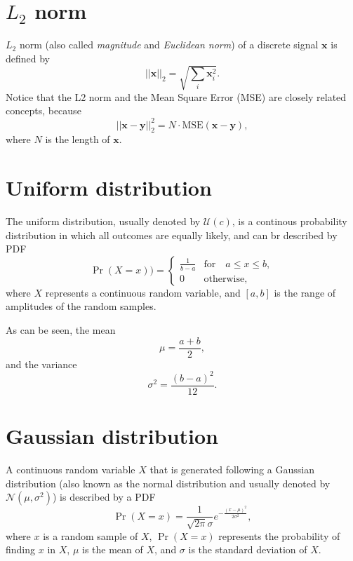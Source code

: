 
\section{$L_2$ norm}
\label{sec:L2_norm}

$L_2$ norm (also called \emph{magnitude} and \emph{Euclidean norm}) of
a discrete signal $\mathbf{x}$ is defined by
\begin{equation}
  ||\mathbf{x}||_2 = \sqrt{\sum_i\mathbf{x}_i^2}.
\end{equation}
Notice that the L2 norm and the Mean Square Error (MSE) are closely
related concepts, because
\begin{equation}
  ||\mathbf{x} - \mathbf{y}||_2^2 = N\cdot\text{MSE}(\mathbf{x} - \mathbf{y}),
\end{equation}
where $N$ is the length of $\mathbf{x}$.


\section{Uniform distribution}

The uniform distribution, usually denoted by $\mathcal{U}(c)$, is a
continous probability distribution in which all outcomes are equally
likely, and can br described by \gls{PDF}
\begin{equation}
  \Pr(X{=}x)) =
  \begin{cases}
    \frac{1}{b-a} & \text{for}\quad a \le x \le b, \\
    0 & \text{otherwise},
  \end{cases}
\end{equation}
where $X$ represents a continuous random variable, and $[a, b]$ is the
range of amplitudes of the random samples.

As can be seen, the mean
\begin{equation}
  \mu = \frac{a+b}{2},
\end{equation}
and the variance
\begin{equation}
  \sigma^2 = \frac{(b-a)^{2}}{12}.
\end{equation}

\section{Gaussian distribution}
\label{sec:gaussian_distribution}

A continuous random variable $X$ that is generated following a Gaussian
distribution (also known as the normal distribution and usually denoted
by $\mathcal{N}(\mu, \sigma^2)$) is described by a \gls{PDF}
\begin{equation}
  \Pr(X{=}x) = \frac{1}{\sqrt{2\pi}\sigma} e^{-\frac{(x-\mu)^2}{2\sigma^2} },
  \label{eq:normal_PDF}
\end{equation}
where $x$ is a random sample of $X$, $\Pr(X{=}x)$ represents the
probability of finding $x$ in $X$, $\mu$ is the mean of $X$, and
$\sigma$ is the standard deviation of $X$.

